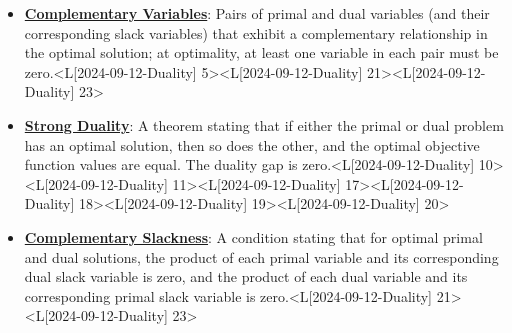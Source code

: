 \documentclass{article}%
\begin{document}
\begin{itemize}[[leftmargin=*]]
\item \href{https://www.math.purdue.edu/~yipn/421/2024-09-12-Duality.pdf#page=5}{\textbf{Complementary Variables}}: Pairs of primal and dual variables (and their corresponding slack variables) that exhibit a complementary relationship in the optimal solution; at optimality, at least one variable in each pair must be zero.<L[2024-09-12-Duality] 5><L[2024-09-12-Duality] 21><L[2024-09-12-Duality] 23>%
\item \href{https://www.math.purdue.edu/~yipn/421/2024-09-12-Duality.pdf#page=10}{\textbf{Strong Duality}}: A theorem stating that if either the primal or dual problem has an optimal solution, then so does the other, and the optimal objective function values are equal. The duality gap is zero.<L[2024-09-12-Duality] 10><L[2024-09-12-Duality] 11><L[2024-09-12-Duality] 17><L[2024-09-12-Duality] 18><L[2024-09-12-Duality] 19><L[2024-09-12-Duality] 20>%
\item \href{https://www.math.purdue.edu/~yipn/421/2024-09-12-Duality.pdf#page=21}{\textbf{Complementary Slackness}}: A condition stating that for optimal primal and dual solutions, the product of each primal variable and its corresponding dual slack variable is zero, and the product of each dual variable and its corresponding primal slack variable is zero.<L[2024-09-12-Duality] 21><L[2024-09-12-Duality] 23>%
\end{itemize}%
\end{document}

